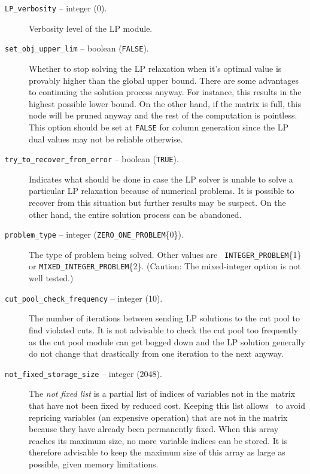 \begin{description}

\item[{\tt LP\_verbosity} -- integer (0).]
Verbosity level of the LP module.

\item[{\tt set\_obj\_upper\_lim} -- boolean ({\tt FALSE}).]
Whether to stop solving the LP relaxation when it's optimal value is
provably higher than the global upper bound. There are some advantages
to continuing the solution process anyway. For instance, this results
in the highest possible lower bound. On the other hand, if the matrix
is full, this node will be pruned anyway and the rest of the
computation is pointless. This option should be set at {\tt FALSE} for
column generation since the LP dual values may not be reliable otherwise.

\item[{\tt try\_to\_recover\_from\_error} -- boolean ({\tt TRUE}).]
Indicates what should be done in case the LP solver is unable to solve
a particular LP relaxation because of numerical problems. It is
possible to recover from this situation but further results may be
suspect. On the other hand, the entire solution process can be
abandoned.

\item[{\tt problem\_type} -- integer ({\tt ZERO\_ONE\_PROBLEM}\{0\}).]
The type of problem being solved. Other values are {\tt
INTEGER\_PROBLEM}\{1\} or {\tt MIXED\_INTEGER\_PROBLEM}\{2\}.
(Caution: The mixed-integer option is not well tested.)

\item[{\tt cut\_pool\_check\_frequency} -- integer (10).]
The number of iterations between sending LP solutions to the cut pool
to find violated cuts. It is not advisable to check the cut pool too
frequently as the cut pool module can get bogged down and the LP
solution generally do not change that drastically from one iteration
to the next anyway.

\item[{\tt not\_fixed\_storage\_size} -- integer (2048).]
The {\em not fixed list} is a partial list of indices of variables not
in the matrix that have not been fixed by reduced cost. Keeping this
list allows \BB\ to avoid repricing variables (an expensive operation)
that are not in the matrix because they have already been permanently
fixed. When this array reaches its maximum size, no more variable
indices can be stored. It is therefore advisable to keep the maximum
size of this array as large as possible, given memory limitations.


\end{description}
